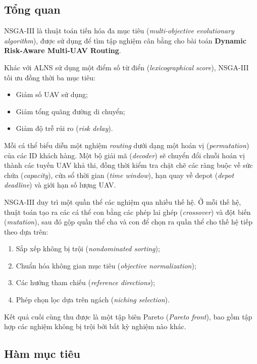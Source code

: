 \documentclass{article}
\begin{document}
\subsection{Tổng quan}

NSGA-III là thuật toán tiến hóa đa mục tiêu (\textit{multi-objective evolutionary algorithm}), được sử dụng để tìm tập nghiệm cân bằng cho bài toán \textbf{Dynamic Risk-Aware Multi-UAV Routing}.

Khác với ALNS sử dụng một điểm số từ điển (\textit{lexicographical score}), NSGA-III tối ưu đồng thời ba mục tiêu:
\begin{itemize}
    \item Giảm số UAV sử dụng;
    \item Giảm tổng quãng đường di chuyển;
    \item Giảm độ trễ rủi ro (\textit{risk delay}).
\end{itemize}

Mỗi cá thể biểu diễn một nghiệm \textit{routing} dưới dạng một hoán vị (\textit{permutation}) của các ID khách hàng. Một bộ giải mã (\textit{decoder}) sẽ chuyển đổi chuỗi hoán vị thành các tuyến UAV khả thi, đồng thời kiểm tra chặt chẽ các ràng buộc về sức chứa (\textit{capacity}), cửa sổ thời gian (\textit{time window}), hạn quay về depot (\textit{depot deadline}) và giới hạn số lượng UAV.

NSGA-III duy trì một quần thể các nghiệm qua nhiều thế hệ. Ở mỗi thế hệ, thuật toán tạo ra các cá thể con bằng các phép lai ghép (\textit{crossover}) và đột biến (\textit{mutation}), sau đó gộp quần thể cha và con để chọn ra quần thể cho thế hệ tiếp theo dựa trên:
\begin{enumerate}
    \item Sắp xếp không bị trội (\textit{nondominated sorting});
    \item Chuẩn hóa không gian mục tiêu (\textit{objective normalization});
    \item Các hướng tham chiếu (\textit{reference directions});
    \item Phép chọn lọc dựa trên ngách (\textit{niching selection}).
\end{enumerate}

Kết quả cuối cùng thu được là một tập biên Pareto (\textit{Pareto front}), bao gồm tập hợp các nghiệm không bị trội bởi bất kỳ nghiệm nào khác.

\subsection{Hàm mục tiêu}
\end{document}
